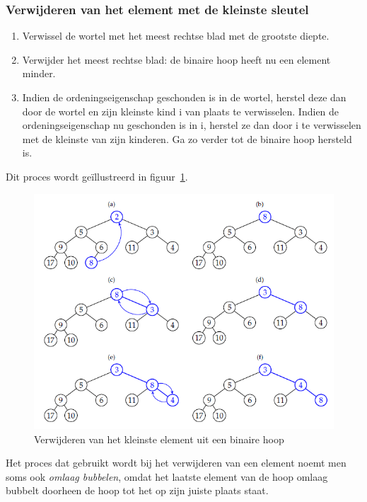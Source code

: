 \documentclass[a4paper,12pt]{article}
\begin{document}
\subsubsection{Verwijderen van het element met de kleinste sleutel}
\begin{enumerate}
\item Verwissel de wortel met het meest rechtse blad met de grootste diepte.
\item Verwijder het meest rechtse blad: de binaire hoop heeft nu een element minder.
\item Indien de ordeningseigenschap geschonden is in de wortel, herstel deze dan door de wortel en zijn kleinste kind i van plaats te verwisselen.
Indien de ordeningseigenschap nu geschonden is in i, herstel ze dan door i te verwisselen met de kleinste van zijn kinderen.
Ga zo verder tot de binaire hoop hersteld is.
\end{enumerate}

Dit proces wordt geïllustreerd in figuur~\ref{fig:VerwijderenBinaireHoop}.

\begin{figure}[H]
	\centering
	\includegraphics[width=.5\linewidth]{img/VerwijderenBinaireHoop}
  	\caption{Verwijderen van het kleinste element uit een binaire hoop}
  	\label{fig:VerwijderenBinaireHoop}
\end{figure}

Het proces dat gebruikt wordt bij het verwijderen van een element
noemt men soms ook \textit{omlaag bubbelen}, omdat het laatste element van de hoop omlaag bubbelt doorheen de hoop tot het op zijn juiste plaats staat.
\end{document}
